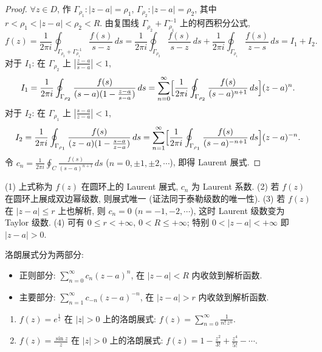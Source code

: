 \documentclass[theorem=false,mathfont=none,openany,sub3section]{easybook}
\begin{document}
\begin{proof}
  $\forall z\in D$, 作 $\Gamma_{\rho_{1}}:|z-a|=\rho_{1}$, $\Gamma_{\rho_{2}}:|z-a|=\rho_{2}$, 其中 $r<\rho_{1}<|z-a|<\rho_{2}<R$.
  由复围线 $\Gamma_{\rho_{2}}+\Gamma_{\rho_{1}}^{-1}$ 上的柯西积分公式,
  \[
  f(z)=\frac{1}{2\pi i}\oint_{\Gamma_{\rho_{2}}+\Gamma_{\rho_{1}}^{-1}}\frac{f(s)}{s-z}\,ds
  =\frac{1}{2\pi i}\oint_{\Gamma_{\rho_{2}}}\frac{f(s)}{s-z}\,ds
  +\frac{1}{2\pi i}\oint_{\Gamma_{\rho_{1}}}\frac{f(s)}{z-s}\,ds
  =I_{1}+I_{2}.
  \]
  对于 $I_{1}$: 在 $\Gamma_{\rho_{2}}$ 上 $|\frac{z-a}{s-a}|<1$,
  \[
  I_{1}=\frac{1}{2\pi i}\oint_{\Gamma_{\rho_{2}}}\frac{f(s)}{(s-a)(1-\frac{z-a}{s-a})}\,ds
  =\sum_{n=0}^{\infty}\Bigl[\frac{1}{2\pi i}\oint_{\Gamma_{\rho_{2}}}\frac{f(s)}{(s-a)^{n+1}}\,ds\Bigr](z-a)^{n}.
  \]
  对于 $I_{2}$: 在 $\Gamma_{\rho_{1}}$ 上 $|\frac{s-a}{z-a}|<1$,
  \[
  I_{2}=\frac{1}{2\pi i}\oint_{\Gamma_{\rho_{1}}}\frac{f(s)}{(z-a)(1-\frac{s-a}{z-a})}\,ds
  =\sum_{n=1}^{\infty}\Bigl[\frac{1}{2\pi i}\oint_{\Gamma_{\rho_{1}}}\frac{f(s)}{(s-a)^{-n+1}}\,ds\Bigr](z-a)^{-n}.
  \]
  令 $c_{n}=\frac{1}{2\pi i}\oint_{C}\frac{f(s)}{(s-a)^{n+1}}\,ds$ ($n=0,\pm1,\pm2,\cdots$), 即得 Laurent 展式.
\end{proof}

\begin{remark}
  (1) 上式称为 $f(z)$ 在圆环上的 Laurent 展式, $c_{n}$ 为 Laurent 系数.
  (2) 若 $f(z)$ 在圆环上展成双边幂级数, 则展式唯一 (证法同于泰勒级数的唯一性).
  (3) 若 $f(z)$ 在 $|z-a|\leq r$ 上也解析, 则 $c_{n}=0$ ($n=-1,-2,\cdots$), 这时 Laurent 级数变为 Taylor 级数.
  (4) 可有 $0\leq r<+\infty$, $0<R\leq+\infty$; 特别 $0<|z-a|<+\infty$ 即 $|z-a|>0$.
\end{remark}

洛朗展式分为两部分:
\begin{itemize}
  \item 正则部分: $\sum_{n=0}^{\infty}c_{n}(z-a)^{n}$, 在 $|z-a|<R$ 内收敛到解析函数.
  \item 主要部分: $\sum_{n=1}^{\infty}c_{-n}(z-a)^{-n}$, 在 $|z-a|>r$ 内收敛到解析函数.
\end{itemize}

\begin{example}
  \begin{enumerate}
    \item $f(z)=e^{\frac{1}{z}}$ 在 $|z|>0$ 上的洛朗展式: $f(z)=\sum_{n=0}^{\infty}\frac{1}{n!\,z^{n}}$.
    \item $f(z)=\frac{\sin z}{z}$ 在 $|z|>0$ 上的洛朗展式: $f(z)=1-\frac{z^{2}}{3!}+\frac{z^{4}}{5!}-\cdots$.
  \end{enumerate}
\end{example}
\end{document}
